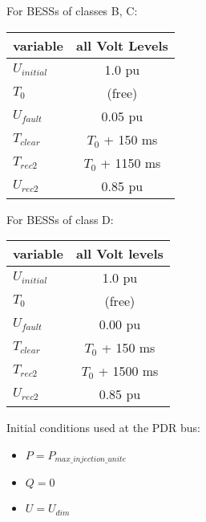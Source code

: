     For BESSs of classes B, C:
    \begin{center}
        \begin{tabular}{lc}
            \toprule
            \textbf{variable} & \textbf{all Volt Levels} \\
            \midrule
            $U_{initial}$     & 1.0 pu                   \\
            $T_{0}$           & (free)                   \\
            $U_{fault}$       & 0.05 pu                  \\
            $T_{clear}$       & $T_{0}$ + 150 ms         \\
            $T_{rec2}$        & $T_{0}$ + 1150 ms        \\
            $U_{rec2}$        & 0.85 pu                  \\
            \bottomrule
        \end{tabular}
    \end{center}

    For BESSs of class D:
    \begin{center}
        \begin{tabular}{lc}
            \toprule
            \textbf{variable} & \textbf{all Volt levels} \\
            \midrule
            $U_{initial}$     & 1.0 pu                   \\
            $T_{0}$           & (free)                   \\
            $U_{fault}$       & 0.00 pu                  \\
            $T_{clear}$       & $T_{0}$ + 150 ms         \\
            $T_{rec2 }$       & $T_{0}$ + 1500 ms        \\
            $U_{rec2}$        & 0.85 pu                  \\
            \bottomrule
        \end{tabular}
    \end{center}

    \begin{description}
        \item Initial conditions used at the PDR bus:
        \begin{itemize}
            \item $P = P_{max\_injection\_unite}$
            \item $Q = 0$
            \item $U = U_{dim}$
        \end{itemize}
    \end{description}

